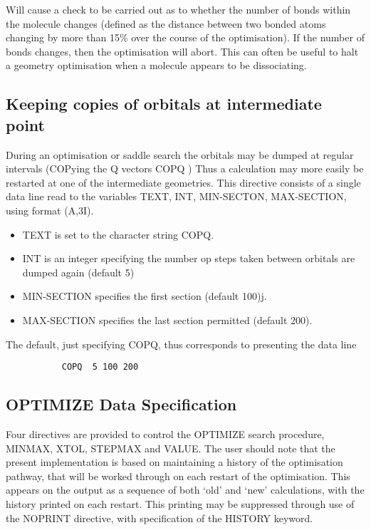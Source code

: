 \documentclass[11pt,fleqn]{article}
\begin{document}
Will cause a check to be carried out as to whether the number of bonds
within the molecule changes (defined as the distance between two
bonded atoms changing by more than 15\% over the course of the
optimisation). If the number of bonds changes, then the optimisation
will abort. This can often be useful to halt a geometry optimisation
when a molecule appears to be dissociating.

\subsection[Keeping copies of orbitals at intermediate points]{Keeping copies of orbitals at intermediate point}
During an optimisation or saddle search the orbitals may be dumped at regular
intervals (COPying the Q vectors COPQ ) Thus a calculation may
more easily be restarted at one of the intermediate geometries. This directive consists of a single 
data line read to the variables TEXT, INT, MIN-SECTON, MAX-SECTION, using format (A,3I).
\begin{itemize}
\item TEXT is set to the character string COPQ.
\item INT is an integer specifying  the number op steps taken between orbitals are dumped again
(default 5)
\item MIN-SECTION specifies the first section (default 100)j.
\item MAX-SECTION specifies the last section permitted (default 200).
\end{itemize}
The default, just specifying COPQ, thus corresponds to presenting the data line

{
\footnotesize
\begin{verbatim}
           COPQ  5 100 200
\end{verbatim}
}


\subsection[OPTIMIZE Data; MINMAX, XTOL, STEPMAX and VALUE]{OPTIMIZE Data Specification}

Four directives are provided to control the OPTIMIZE search procedure, 
MINMAX, XTOL, STEPMAX and VALUE. The user should note that the
present implementation is based on maintaining a history of the
optimisation pathway, that will be worked through on each restart of
the optimisation. This appears on the output as a sequence of both
`old' and `new' calculations, with the history printed on each
restart. This printing may be suppressed through use of the
NOPRINT directive, with specification of the HISTORY keyword.
\end{document}
